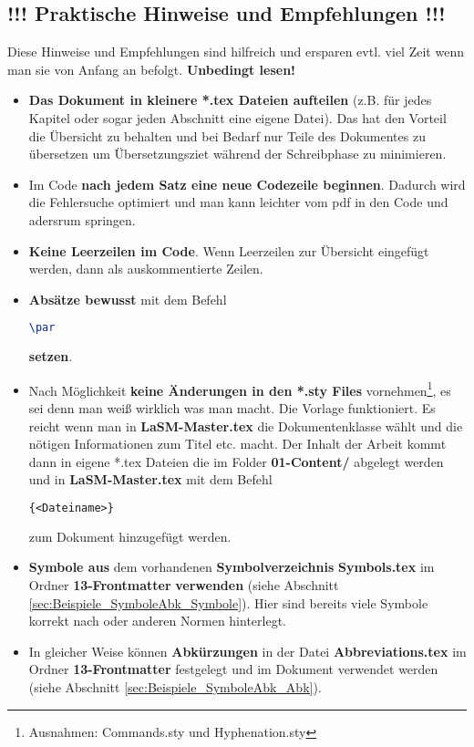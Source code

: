 \subsection{!!! Praktische Hinweise und Empfehlungen !!!}
%
Diese Hinweise und Empfehlungen sind hilfreich und ersparen evtl. viel Zeit wenn man sie von Anfang an befolgt. \textbf{Unbedingt lesen!}
%
\begin{itemize}
	\item \textbf{Das Dokument in kleinere *.tex Dateien aufteilen} (z.B. für jedes Kapitel oder sogar jeden Abschnitt eine eigene Datei). 
	Das hat den Vorteil die Übersicht zu behalten und bei Bedarf nur Teile des Dokumentes zu übersetzen um Übersetzungsziet während der Schreibphase zu minimieren.
	\item Im Code \textbf{nach jedem Satz eine neue Codezeile beginnen}.
	Dadurch wird die Fehlersuche optimiert und man kann leichter vom pdf in den Code und adersrum springen.
	\item \textbf{Keine Leerzeilen im Code}. Wenn Leerzeilen zur Übersicht eingefügt werden, dann als auskommentierte Zeilen.
	\item \textbf{Absätze bewusst} mit dem Befehl
	\begin{lstlisting}[language=tex]
\par\end{lstlisting}
    \textbf{setzen}.
	\item Nach Möglichkeit \textbf{keine Änderungen in den *.sty Files} vornehmen\footnote{Ausnahmen: Commands.sty und Hyphenation.sty}, es sei denn man weiß wirklich was man macht.
	Die Vorlage funktioniert. Es reicht wenn man in \textbf{LaSM-Master.tex} die Dokumentenklasse wählt und die nötigen Informationen zum Titel etc. macht.
	Der Inhalt der Arbeit kommt dann in eigene *.tex Dateien die im Folder \textbf{01-Content/} abgelegt werden und in \textbf{LaSM-Master.tex} mit dem Befehl
	\begin{lstlisting}[language=tex]
{<Dateiname>}\end{lstlisting}
	zum Dokument hinzugefügt werden.
	\item \textbf{Symbole aus} dem vorhandenen \textbf{Symbolverzeichnis} \textbf{Symbols.tex} im Ordner \textbf{13-Frontmatter} \textbf{verwenden} (siehe Abschnitt \ref{sec:Beispiele_SymboleAbk_Symbole}). 
	Hier sind bereits viele Symbole korrekt nach \citeauthor{DINENISO800004:202001} oder anderen Normen hinterlegt.
	\item In gleicher Weise können \textbf{Abkürzungen} in der Datei \textbf{Abbreviations.tex} im Ordner \textbf{13-Frontmatter} festgelegt und im Dokument verwendet werden (siehe Abschnitt \ref{sec:Beispiele_SymboleAbk_Abk}).

\end{itemize}
